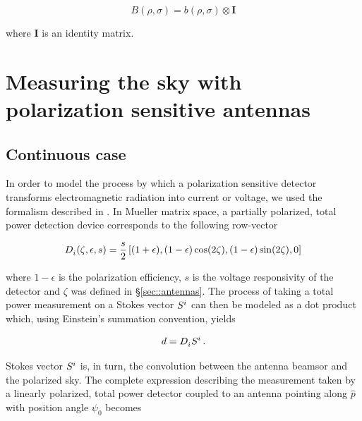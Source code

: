 \documentclass[a4paper,11pt]{article}
\begin{document}
\begin{equation}
B(\rho,\sigma) = \mathit{b}(\rho,\sigma) \otimes \mathbf{I}{}
\end{equation}

\noindent
where $\mathbf{I}$ is an identity matrix. 

\section{Measuring the sky with polarization sensitive antennas}
\label{sec::convolution}
	
\subsection{Continuous case}

In order to model the process by which a polarization sensitive detector transforms electromagnetic radiation into current or voltage, we used the formalism described in \cite{2007A&A...470..771J}. In Mueller matrix space, a partially polarized, total power detection device corresponds to the following row-vector 

\begin{equation}
\begin{aligned}
\tensor{D}{_{i}}(\zeta,\epsilon,s) = \frac{s}{2} \left[(1 + \epsilon), (1 - \epsilon)\cos(2\zeta), (1 - \epsilon)\sin(2\zeta), 0 \right]
\end{aligned}
\label{eq::M_pol}
\end{equation}

\noindent
where $1 - \epsilon$ is the polarization efficiency, $s$ is the voltage responsivity of the detector and $\zeta$ was defined in \S\ref{sec::antennas}. The process of taking a total power measurement on a Stokes vector $\tensor{S}{^{i}}$ can then be modeled as a dot product which, using Einstein's summation convention, yields

\begin{equation}
\begin{aligned}
d = \tensor{D}{_{i}} \tensor{S}{^{i}} \, .
\end{aligned}
\label{eq::total_power_measurement}
\end{equation}

Stokes vector $\tensor{S}{^{i}}$ is, in turn, the convolution between the antenna beamsor and the polarized sky. The complete expression describing the measurement taken by a linearly polarized, total power detector coupled to an antenna pointing along $\hat{p}$ with position angle $\psi_0$ becomes
\end{document}
